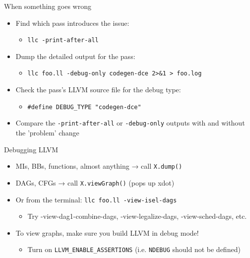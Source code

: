 
\begin{frame}{When something goes wrong}

\begin{itemize}
    \item Find which pass introduces the issue:
    \begin{itemize}
        \item \texttt{llc -print-after-all}
    \end{itemize}
    \item Dump the detailed output for the pass:
    \begin{itemize}
        \item \texttt{llc foo.ll -debug-only codegen-dce 2>\&1 > foo.log}
    \end{itemize}
    \item Check the pass's LLVM source file for the debug type:
    \begin{itemize}
        \item \texttt{\#define DEBUG\_TYPE "codegen-dce"}
    \end{itemize}
    \item Compare the \texttt{-print-after-all} or \texttt{-debug-only} outputs with and without the 'problem' change
\end{itemize}

\end{frame}


\begin{frame}{Debugging LLVM}

\begin{itemize}
    \item MIs, BBs, functions, almost anything → call \texttt{X.dump()}
    \item DAGs, CFGs → call \texttt{X.viewGraph()} (pops up xdot)
    \item Or from the terminal: \texttt{llc foo.ll -view-isel-dags}
    \begin{itemize}
        \item Try -view-dag1-combine-dags, -view-legalize-dags, -view-sched-dags, etc.
    \end{itemize}
    \item To view graphs, make sure you build LLVM in debug mode!
    \begin{itemize}
        \item Turn on \texttt{LLVM\_ENABLE\_ASSERTIONS} (i.e. \texttt{NDEBUG} should not be defined)
    \end{itemize}
\end{itemize}

\end{frame}

